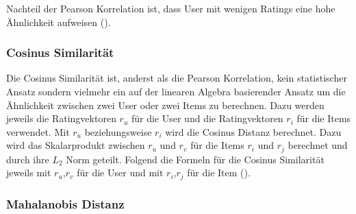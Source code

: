 Nachteil der Pearson Korrelation ist, dass User mit wenigen Ratings eine hohe Ähnlichkeit aufweisen (\cite{Ekstrand2011}).

\subsubsection{Cosinus Similarität}

Die Cosinus Similarität ist, anderst als die Pearson Korrelation, kein statistischer Ansatz sondern vielmehr ein auf der linearen Algebra basierender Ansatz um die Ähnlichkeit zwischen zwei User oder zwei Items zu berechnen. Dazu werden jeweils die Ratingvektoren $r_u$ für die User und die Ratingvektoren $r_i$ für die Items verwendet.
Mit $r_u$ beziehungsweise $r_i$ wird die Cosinus Distanz berechnet. Dazu wird das Skalarprodukt zwischen $r_u$ und $r_v$ für die Items $r_i$ und $r_j$ berechnet und durch ihre $L_2$ Norm geteilt.
Folgend die Formeln für die Cosinus Similarität jeweils mit $r_u$,$r_v$ für die User und mit $r_i$,$r_j$ für die Item (\cite{Ekstrand2011}).




\subsubsection{Mahalanobis Distanz}








